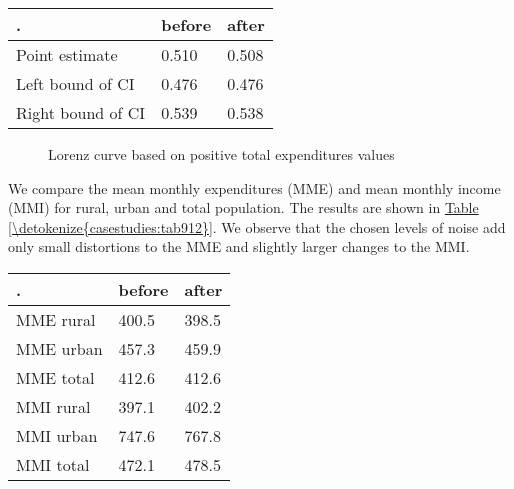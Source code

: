 \documentclass[letterpaper,10pt,english]{sphinxmanual}
\begin{document}
\begin{savenotes}\sphinxattablestart
\centering
{}
\label{\detokenize{casestudies:tab911}}\label{\detokenize{casestudies:id31}}
\sphinxaftercaption
\begin{tabulary}{\linewidth}[t]{|T|T|T|}
\hline
\sphinxstyletheadfamily 
.
&\sphinxstyletheadfamily 
before
&\sphinxstyletheadfamily 
after
\\
\hline
Point estimate
&
0.510
&
0.508
\\
\hline
Left bound of CI
&
0.476
&
0.476
\\
\hline
Right bound of CI
&
0.539
&
0.538
\\
\hline
\end{tabulary}
\par
\sphinxattableend\end{savenotes}

\begin{figure}[htbp]
\centering
\capstart

\noindent{}
\caption{Lorenz curve based on positive total expenditures values}\label{\detokenize{casestudies:fig91}}\label{\detokenize{casestudies:id32}}\end{figure}

We compare the mean monthly expenditures (MME) and mean monthly income
(MMI) for rural, urban and total population. The results are shown in
\hyperref[\detokenize{casestudies:tab912}]{Table \ref{\detokenize{casestudies:tab912}}}. We observe that the chosen levels of noise add only small
distortions to the MME and slightly larger changes to the MMI.


\begin{savenotes}\sphinxattablestart
\centering
{}
\label{\detokenize{casestudies:tab912}}\label{\detokenize{casestudies:id33}}
\sphinxaftercaption
\begin{tabulary}{\linewidth}[t]{|T|T|T|}
\hline
\sphinxstyletheadfamily 
.
&\sphinxstyletheadfamily 
before
&\sphinxstyletheadfamily 
after
\\
\hline
MME rural
&
400.5
&
398.5
\\
\hline
MME urban
&
457.3
&
459.9
\\
\hline
MME total
&
412.6
&
412.6
\\
\hline
MMI rural
&
397.1
&
402.2
\\
\hline
MMI urban
&
747.6
&
767.8
\\
\hline
MMI total
&
472.1
&
478.5
\\
\hline
\end{tabulary}
\par
\sphinxattableend\end{savenotes}
\end{document}
